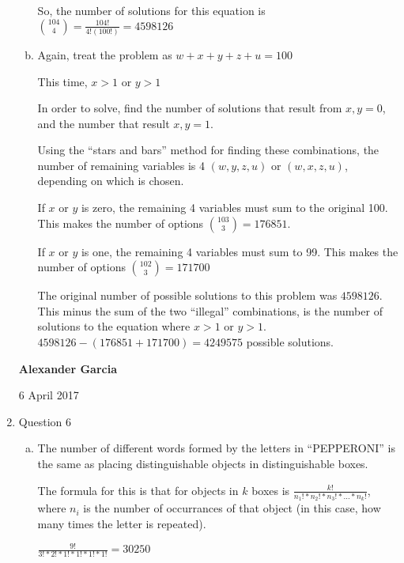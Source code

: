 \documentclass[11pt]{article}
\begin{document}
\begin{enumerate}
\begin{enumerate}[(a)]
				So, the number of solutions for this equation is
				$\binom{104}{4} = \frac{104!}{4!(100!)} = 4598126$ \\

			\item Again, treat the problem as $w+x+y+z+u = 100$

				This time, $x>1$ or $y>1$

				In order to solve, find the number of solutions that
				result from $x, y=0$, and the number that result
				$x, y = 1$.

				Using the ``stars and bars'' method for finding these combinations,
				the number of remaining variables is 4 $(w, y, z, u)$ or $(w, x, z, u)$,
				depending on which is chosen.

				If $x$ or $y$ is zero, the remaining 4 variables
				must sum to the original 100. This makes the number of options
				$\binom{103}{3} = 176851$.

				If $x$ or $y$ is one, the remaining 4 variables
				must sum to 99. This makes the number of options
				$\binom{102}{3} = 171700$

				The original number of possible solutions to this problem was
				$4598126$. This minus the sum of the two ``illegal''
				combinations, is the number of solutions to the equation
				where $x>1$ or $y>1$. \\

				$4598126 - (176851 + 171700) = 4249575$ possible solutions.

		\end{enumerate}

		\newpage

		\textbf{Alexander Garcia}

		6 April 2017 \\

	\item Question 6

		\begin{enumerate}[(a)]

			\item The number of different words formed by the letters
				in ``PEPPERONI'' is the same as placing distinguishable
				objects in distinguishable boxes.

				The formula for this is that for objects in $k$ boxes
				is $\frac{k!}{n_1!*n_2!*n_3!*\dots*n_k!}$, where $n_i$ is
				the number of occurrances of that object (in this case, how
				many times the letter is repeated).

				$\frac{9!}{3!*2!*1!*1!*1!*1!} = 30250$ \\


\end{enumerate}
\end{enumerate}
\end{document}
